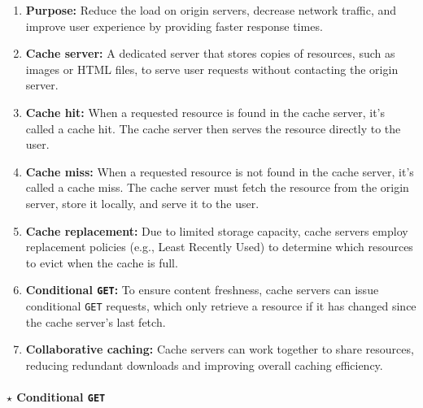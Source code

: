 \begin{enumerate}
    \item \textbf{Purpose:} Reduce the load on origin servers, decrease network traffic, and improve user experience by providing faster response times.
    \item \textbf{Cache server:} A dedicated server that stores copies of resources, such as images or HTML files, to serve user requests without contacting the origin server.
    \item \textbf{Cache hit:} When a requested resource is found in the cache server, it's called a cache hit. The cache server then serves the resource directly to the user.
    \item \textbf{Cache miss:} When a requested resource is not found in the cache server, it's called a cache miss. The cache server must fetch the resource from the origin server, store it locally, and serve it to the user.
    \item \textbf{Cache replacement:} Due to limited storage capacity, cache servers employ replacement policies (e.g., Least Recently Used) to determine which resources to evict when the cache is full.
    \item \textbf{Conditional \texttt{GET}:} To ensure content freshness, cache servers can issue conditional \texttt{GET} requests, which only retrieve a resource if it has changed since the cache server's last fetch.
    \item \textbf{Collaborative caching:} Cache servers can work together to share resources, reducing redundant downloads and improving overall caching efficiency.
\end{enumerate}

\paragraph[2.2.6.1 Conditional \texttt{GET}]{$\pmb{\star}$ Conditional \texttt{GET}}\mbox{}

